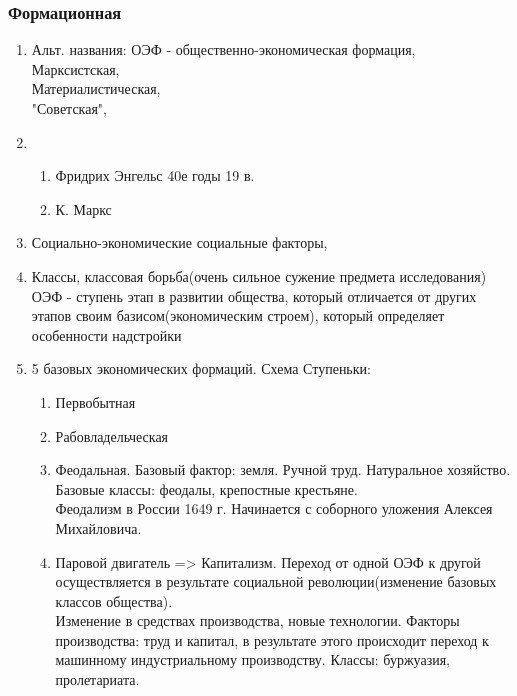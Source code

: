 \documentclass[a4paper]{article}
\begin{document}
\subsubsection{Формационная}
\begin{enumerate}
    \item Альт. названия:
    ОЭФ - общественно-экономическая формация, \\
    Марксистская, \\
    Материалистическая, \\
    "Советская", \\
    \item
        \begin{enumerate}
        \item Фридрих Энгельс 40е годы 19 в.
        \item К. Маркс
        \end{enumerate}
    \item Социально-экономические социальные факторы,
    \item Классы, классовая борьба(очень сильное сужение предмета исследования) \\
        ОЭФ - ступень этап в развитии общества, который отличается от других этапов своим базисом(экономическим строем), который определяет особенности надстройки
    \item 5 базовых экономических формаций. Схема Ступеньки:
    \begin{enumerate}
        \item Первобытная
        \item Рабовладельческая
        \item Феодальная. Базовый фактор: земля. Ручной труд. Натуральное хозяйство. Базовые классы: феодалы, крепостные крестьяне. \\
        Феодализм в России 1649 г. Начинается с соборного уложения Алексея Михайловича.
        \item Паровой двигатель => Капитализм. Переход от одной ОЭФ к другой осуществляется в результате социальной революции(изменение базовых классов общества). \\ Изменение в средствах производства, новые технологии. Факторы производства: труд и капитал, в результате этого происходит переход к машинному индустриальному производству. Классы: буржуазия, пролетариата.
    \end{enumerate}



\end{enumerate}
\end{document}
